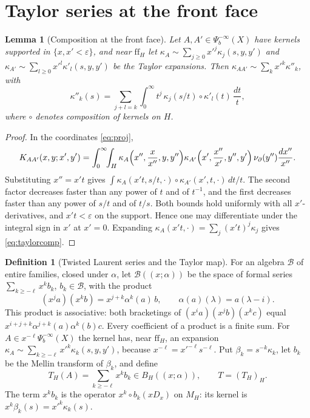 \documentclass[11pt,oneside,reqno]{article}
\theoremstyle{plain}
\newtheorem{lemma}[theorem]{Lemma}
\theoremstyle{definition}
\newtheorem{definition}[theorem]{Definition}
\theoremstyle{remark}
\newcommand{\Lser}[1]{(\!(#1)\!)}
\begin{document}
\section{Taylor series at the front face}\label{sec:taylor}

\begin{lemma}[Composition at the front face]\label{lem:compff}
Let \(A,A'\in\Psi_b^{-\infty}(X)\) have kernels supported in
\(\{x,x'<\varepsilon\}\), and near \(\mathrm{ff}_H\) let
\(\kappa_A\sim\sum_{j\geq0}x'^j\kappa_j(s,y,y')\) and
\(\kappa_{A'}\sim\sum_{l\geq0}x'^l\kappa'_l(s,y,y')\) be the Taylor
expansions. Then \(\kappa_{AA'}\sim\sum_kx'^k\kappa''_k\), with
\begin{equation}\label{eq:taylorcomp}
 \kappa''_k(s)=\sum_{j+l=k}\int_0^\infty t^j\,\kappa_j(s/t)\circ
 \kappa'_l(t)\,\frac{dt}{t},
\end{equation}
where \(\circ\) denotes composition of kernels on \(H\).
\end{lemma}

\begin{proof}
In the coordinates \eqref{eq:proj},
\[
 K_{AA'}(x,y;x',y')=\int_0^\infty\!\!\int_H
 \kappa_A\Bigl(x'',\frac{x}{x''},y,y''\Bigr)
 \kappa_{A'}\Bigl(x',\frac{x''}{x'},y'',y'\Bigr)\,
 \nu_\partial(y'')\frac{dx''}{x''}.
\]
Substituting \(x''=x't\) gives
\(\int\kappa_A(x't,s/t,\cdot)\circ\kappa_{A'}(x',t,\cdot)\,dt/t\). The
second factor decreases faster than any power of \(t\) and of \(t^{-1}\),
and the first decreases faster than any power of \(s/t\) and of \(t/s\).
Both bounds hold uniformly with all \(x'\)-derivatives, and \(x't<\varepsilon\)
on the support. Hence one may differentiate under the integral sign in
\(x'\) at \(x'=0\). Expanding \(\kappa_A(x't,\cdot)=\sum_j(x't)^j\kappa_j\)
gives \eqref{eq:taylorcomp}.
\end{proof}

\begin{definition}[Twisted Laurent series and the Taylor map]
For an algebra \(\mathcal B\) of entire families, closed under
\(\alpha\), let \(\mathcal B\Lser{x;\alpha}\) be the space of formal series
\(\sum_{k\geq-\ell}x^kb_k\), \(b_k\in\mathcal B\), with the product
\begin{equation}\label{eq:skew}
 (x^ja)(x^kb)=x^{j+k}\alpha^k(a)\,b,\qquad
 \alpha(a)(\lambda)=a(\lambda-i).
\end{equation}
This product is associative: both bracketings of
\((x^ia)(x^jb)(x^kc)\) equal \(x^{i+j+k}\alpha^{j+k}(a)\alpha^k(b)c\).
Every coefficient of a product is a finite sum. For
\(A\in x^{-\ell}\Psi_b^{-\infty}(X)\) the kernel has, near
\(\mathrm{ff}_H\), an expansion \(\kappa_A\sim\sum_{k\geq-\ell}x'^k
\kappa_k(s,y,y')\), because \(x^{-\ell}=x'^{-\ell}s^{-\ell}\). Put
\(\beta_k=s^{-k}\kappa_k\), let \(b_k\) be the Mellin transform of
\(\beta_k\), and define
\[
 T_H(A)=\sum_{k\geq-\ell}x^kb_k\in B_H\Lser{x;\alpha},\qquad
 T=(T_H)_H .
\]
The term \(x^kb_k\) is the operator \(x^k\circ b_k(xD_x)\) on \(M_H\): its
kernel is \(x^k\beta_k(s)=x'^k\kappa_k(s)\).
\end{definition}
\end{document}
